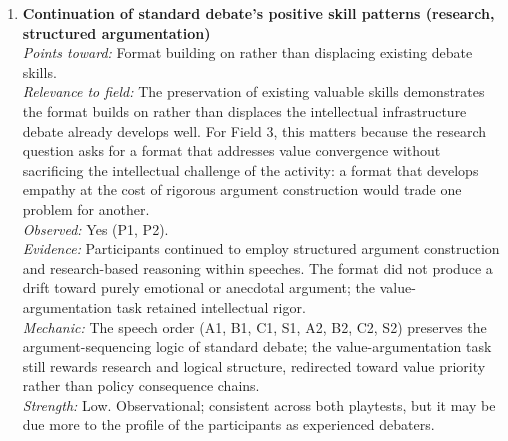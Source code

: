 \begin{enumerate}
\textit{Mechanic:} The character assignment system (``you represent the Subject's value of X'') and the personal dilemma motion structure (providing a named character with specific circumstances) invite perspective-taking without instructing it; the Subject as a named individual rather than an abstract adjudicator provides a concrete human recipient for empathetic reasoning. The absence of a rebuttal-rewarding scoring category inverts the rhetorical incentive structure, making polite, collaborative, synthesis-oriented engagement strategically advantageous rather than weakly punished.\\
\textit{Strength:} Strong. Behavioral for second playtest; self-report for first playtest; consistent direction.

\item \textbf{Continuation of standard debate's positive skill patterns (research, structured argumentation)}\\
\textit{Points toward:} Format building on rather than displacing existing debate skills.\\
\textit{Relevance to field:} The preservation of existing valuable skills demonstrates the format builds on rather than displaces the intellectual infrastructure debate already develops well. For Field 3, this matters because the research question asks for a format that addresses value convergence without sacrificing the intellectual challenge of the activity: a format that develops empathy at the cost of rigorous argument construction would trade one problem for another.\\
\textit{Observed:} Yes (P1, P2).\\
\textit{Evidence:} Participants continued to employ structured argument construction and research-based reasoning within speeches. The format did not produce a drift toward purely emotional or anecdotal argument; the value-argumentation task retained intellectual rigor.\\
\textit{Mechanic:} The speech order (A1, B1, C1, S1, A2, B2, C2, S2) preserves the argument-sequencing logic of standard debate; the value-argumentation task still rewards research and logical structure, redirected toward value priority rather than policy consequence chains.\\
\textit{Strength:} Low. Observational; consistent across both playtests, but it may be due more to the profile of the participants as experienced debaters. 


\end{enumerate}
